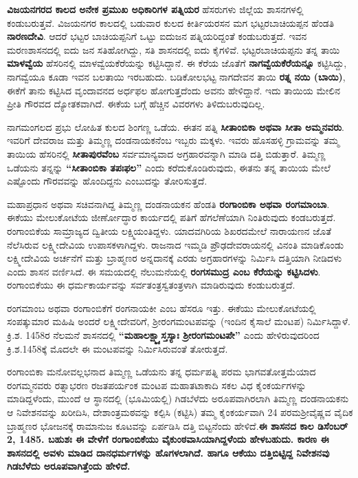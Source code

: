 \textbf{ವಿಜಯನಗರದ ಕಾಲದ ಅನೇಕ ಪ್ರಮುಖ ಅಧಿಕಾರಿಗಳ ಪತ್ನಿಯರ} ಹೆಸರುಗಳು ಜಿಲ್ಲೆಯ ಶಾಸನಗಳಲ್ಲಿ ಕಂಡು\-ಬರುತ್ತವೆ. ವಿಜಯನಗರ ಕಾಲದಲ್ಲಿ ಬಡುವಾರ ಕುಲದ ಕೀರ್ತಿಯರಸನ ಮಗ ಭಟ್ಟರಬಾಚಿಯಪ್ಪನ ಹೆಂಡತಿ \textbf{ನಾರಣದೇವಿ}. ಆದರೆ ಭಟ್ಟರ ಬಾಚಿಯಪ್ಪನಿಗೆ ಒಟ್ಟು ಐದುಜನ ಪತ್ನಿಯರಿದ್ದಂತೆ ಕಂಡುಬರುತ್ತದೆ. ಇವನ ಮರಣಶಾಸನದಲ್ಲಿ ಐದು ಜನ ಸತಿಹೋಗಿದ್ದು, ಸತಿ ಶಾಸನದಲ್ಲಿ ಐದು ಕೈಗಳಿವೆ. ಭಟ್ಟರಬಾಚಿಯಪ್ಪನು ತನ್ನ ತಾಯಿ \textbf{ಮಾಳವ್ವೆಯ} ಹೆಸರಿನಲ್ಲಿ ಮಾಳವ್ವೆಯಕೆರೆಯನ್ನು ಕಟ್ಟಿಸಿದ್ದಾನೆ. ಈ ಕೆರೆಯ ಜೊತೆಗೆ \textbf{ನಾಗವ್ವೆಯಕೆರೆಯನ್ನೂ} ಕಟ್ಟಿಸಿದ್ದು, ನಾಗವ್ವೆಯೂ ಕೂಡಾ ಇವನ ಬಲತಾಯಿ ಇರಬಹುದು. ಬಡಿಕೋಲಭಟ್ಟ ನಾಗದೇವನ ತಾಯಿ \textbf{ರತ್ನ ನಯಿ (ಬಾಯಿ)}, ಈಕೆಗೆ ತಾನು ಕಟ್ಟಿಸಿದ ವೃಂದಾವನದ ಅರ್ಧಫಲ ಹೋಗುತ್ತದೆಂದು ಅವನು ಹೇಳಿದ್ದಾನೆ. ಇದು ತಾಯಿಯ ಮೇಲಿನ ಪ್ರೀತಿ ಗೌರವದ ದ್ಯೋತಕವಾಗಿದೆ. ಈಕೆಯ ಬಗ್ಗೆ ಹೆಚ್ಚಿನ ವಿವರಗಳು ತಿಳಿದುಬರುವುದಿಲ್ಲ.

ನಾಗಮಂಗಲದ ಪ್ರಭು ಲೋಹಿತ ಕುಲದ ಶಿಂಗಣ್ಣ ಒಡೆಯ. ಈತನ ಪತ್ನಿ \textbf{ಸೀತಾಂಬಿಕಾ ಅಥವಾ ಸೀತಾ ಅಮ್ಮನವರು}. ಇವರಿಗೆ ದೇವರಾಜ ಮತ್ತು ತಿಮ್ಮಣ್ಣ ದಂಡನಾಯಕನೆಂಬ ಇಬ್ಬರು ಮಕ್ಕಳು. ಇವರು ಹೊಸಹಳ್ಳಿ ಗ್ರಾಮವನ್ನು ತಮ್ಮ ತಾಯಿಯ ಹೆಸರಿನಲ್ಲಿ \textbf{ಸೀತಾಪುರವೆಂಬ} ಸರ್ವಮಾನ್ಯವಾದ ಅಗ್ರಹಾರವನ್ನಾಗಿ ಮಾಡಿ ದತ್ತಿ ಬಿಡುತ್ತಾರೆ. ತಿಮ್ಮಣ್ಣ ಒಡೆಯನು ತನ್ನನ್ನು \textbf{“ಸೀತಾಂಬಿಕಾ ತಪಃಫಲ”} ಎಂದು ಕರೆದುಕೊಂಡಿರುವುದು, ಈತನು ತನ್ನ ತಾಯಿಯ ಮೇಲೆ ಎಷ್ಟೊಂದು ಗೌರವವನ್ನು ಹೊಂದಿದ್ದನು ಎಂಬುದನ್ನು ತೋರಿಸುತ್ತದೆ.

ಮಹಾಪ್ರಧಾನ ಅಥವಾ ಸಚಿವನಾಗಿದ್ದ ತಿಮ್ಮಣ್ಣ ದಂಡನಾಯಕನ ಹೆಂಡತಿ \textbf{ರಂಗಾಂಬಿಕಾ ಅಥವಾ ರಂಗಮಾಂಬಾ}. ಈಕೆಯು ಮೇಲುಕೋಟೆಯ ಜೀರ್ಣೋದ್ಧಾರ ಕಾರ್ಯದಲ್ಲಿ ಪತಿಗೆ ಹೆಗಲೆಣೆಯಾಗಿ ನಿಂತಿರುವುದು ಕಂಡಬರುತ್ತದೆ. ರಂಗಾಂಬಿಕೆಯ ಸಾಮ್ರಾಜ್ಯದ ದ್ವಿತೀಯ ಲಕ್ಷ್ಮಿಯಂತಿದ್ದಳು. ಯಾದವಗಿರಿಯ ಶಿಖರದಮೇಲೆ ನಾರಾಯಣನ ಜೊತೆ ನೆಲೆಸಿರುವ ಲಕ್ಷ್ಮೀದೇವಿಯ ಉಪಾಸಕಳಾಗಿದ್ದಳು. ರಾಜನಾದ ಇಮ್ಮಡಿ ಪ್ರೌಢದೇವರಾಯನಲ್ಲಿ ವಿನಂತಿ ಮಾಡಿಕೊಂಡು ಲಕ್ಷ್ಮೀದೇವಿಯ ಅರ್ಚನೆಗೆ ಮತ್ತು ಬ್ರಾಹ್ಮಣರ ಅನ್ನದಾನಕ್ಕೆ ಎರಡು ಅಗ್ರಹಾರಗಳನ್ನು ನಿರ್ಮಿಸಿ ದತ್ತಿಯಾಗಿ ನೀಡಿದಳು ಎಂದು ಶಾಸನ ವರ್ಣಿಸಿದೆ. ಈ ಸಮಯದಲ್ಲಿ ನೆಲುಮನೆಯಲ್ಲಿ \textbf{ರಂಗಸಮುದ್ರ ಎಂಬ ಕೆರೆಯನ್ನು ಕಟ್ಟಿಸಿದಳು}. ರಂಗಾಂಬಿಕೆಯು ಈ ಧರ್ಮಕಾರ್ಯವನ್ನು ಸರ್ವತಂತ್ರಸ್ವತಂತ್ರಳಾಗಿ ಮಾಡಿರುವುದು ಕಂಡುಬರುತ್ತದೆ.

ರಂಗಮಾಂಬ ಅಥವಾ ರಂಗಾಂಬಿಕೆಗೆ ರಂಗನಾಯಕೀ ಎಂಬ ಹೆಸರೂ ಇತ್ತು. ಈಕೆಯು ಮೇಲುಕೋಟೆಯಲ್ಲಿ ಸಂಪತ್ಕುಮಾರ ಮಹಿಷಿ ಅಂದರೆ ಲಕ್ಷ್ಮೀದೇವರಿಗೆ, ಶ‍್ರೀರಂಗಮಂಟಪವನ್ನು (ಇಂದಿನ ಕೈಸಾಲೆ ಮಂಟಪ) ನಿರ್ಮಿಸಿದ್ದಾಳೆ. ಕ್ರಿ.ಶ. 1458ರ ನೆಲಮನೆ ಶಾಸನದಲ್ಲಿ \textbf{“ಮಹಾಲಕ್ಷ್ಮ್ಯಾಸ್ತಸ್ಯಾಃ ಶ‍್ರೀರಂಗಮಂಟಪೇ”} ಎಂದು ಹೇಳಿರುವುದರಿಂದ ಕ್ರಿ.ಶ.1458ಕ್ಕೆ ಮೊದಲೇ ಈ ಮಂಟಪವನ್ನು ನಿರ್ಮಿಸಿರುವಂತೆ ತೋರುತ್ತದೆ.

ರಂಗಾಂಬಿಕಾ ಮನೋವಲ್ಲಭನಾದ ತಿಮ್ಮಣ್ಣ ಒಡೆಯನು ತನ್ನ ಧರ್ಮಪತ್ನಿ ಪರಮ ಭಾಗವತೋತ್ತಮೆಯಾದ ರಂಗಮ್ಮನವರು ರತ್ನಾಭರಣ ರಜತಪರ್ಯಂಕ ಮಂಟಪ ಮಹಾತಟಾಕಾದಿ ಸಕಲ ವಿಧ ಕೈಂಕರ್ಯಗಳನ್ನು ಮಾಡಿದ್ದಳೆಂದು, ಮುಂದೆ ಆ ಸ್ಥಾನದಲ್ಲಿ (ಭೂಮಿಯಲ್ಲಿ) ಗಿಡಬೆಳೆದು ಅರೂಪವಾಗಿರಲಾಗಿ ತಿಮ್ಮಣ್ಣ ದಂಡನಾಯಕನು ಆ ನಿವೇಶನವನ್ನು ಖರೀದಿಸಿ, ದೇಶಾಂತ್ರಮಠವನ್ನು ಕಲ್ಪಿಸಿ (ಕಟ್ಟಿಸಿ) ತಮ್ಮ ಕೈಂಕರ್ಯವಾಗಿ 24 ಪರಮಶ‍್ರೀವೈಷ್ಣವ ವೈದಿಕ ಬ್ರಾಹ್ಮಣರ ಭೋಜನಕ್ಕೆ ರಾಮಾನುಜ ಕೂಟವನ್ನು ಏರ್ಪಡಿಸಿ ದತ್ತಿ ಬಿಟ್ಟನೆಂದು ಹೇಳಿದೆ.\textbf{ಈ ಶಾಸನದ ಕಾಲ ಡಿಸೆಂಬರ್​ 2, 1485. ಬಹುಶಃ ಈ ವೇಳೆಗೆ ರಂಗಾಂಬಿಕೆಯು ವೈಕುಂಠವಾಸಿಯಾಗಿದ್ದಳೆಂದು ಹೇಳಬಹುದು. ಕಾರಣ ಈ ಶಾಸನದಲ್ಲಿ ಅವಳು ಮಾಡಿದ ದಾನಧರ್ಮಗಳನ್ನು ಹೊಗಳಲಾಗಿದೆ. ಹಾಗೂ ಆಕೆಯು ದತ್ತಿಬಿಟ್ಟಿದ್ದ ನಿವೇಶನವು ಗಿಡಬೆಳೆದು ಅರೂಪವಾಗಿತ್ತೆಂದು ಹೇಳಿದೆ.}

